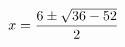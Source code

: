 \documentclass[preview]{standalone}
\begin{document}
\begin{align*}
\special{dvisvgm:raw <g id='unique000'>}x=\frac{6\pm\sqrt{36-52}}{2}\special{dvisvgm:raw </g>}
\end{align*}
\end{document}

